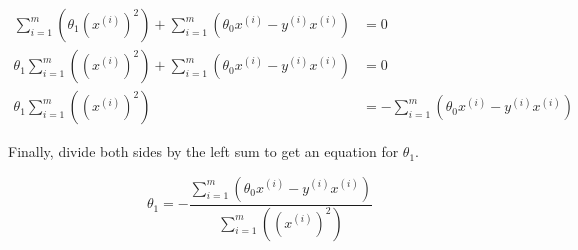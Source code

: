 \documentclass[12pt, a4paper]{article}
\begin{document}
	\begin{align}
	\sum\limits_{i=1}^m(\theta_1(x^{(i)})^2 ) + \sum\limits_{i=1}^m(\theta_0x^{(i)} - y^{(i)}x^{(i)}) &= 0\\
	\theta_1\sum\limits_{i=1}^m((x^{(i)})^2 ) + \sum\limits_{i=1}^m(\theta_0x^{(i)} - y^{(i)}x^{(i)}) &= 0\\
	\theta_1\sum\limits_{i=1}^m((x^{(i)})^2 )   &= - \sum\limits_{i=1}^m(\theta_0x^{(i)} - y^{(i)}x^{(i)})
	\end{align}
	
	Finally, divide both sides by the left sum to get an equation for $\theta_1$.
	
	\begin{equation*}
	\theta_1 = -\frac{\sum\limits_{i=1}^m(\theta_0x^{(i)} - y^{(i)}x^{(i)})}{\sum\limits_{i=1}^m((x^{(i)})^2 )}
	\end{equation*}
\end{document}

